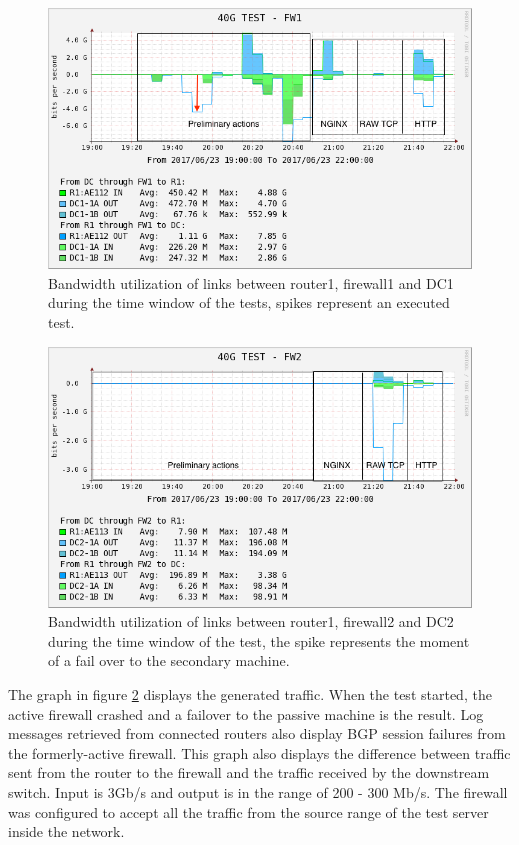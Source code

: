 \begin{figure}[H]
  \includegraphics[scale=0.5]{images/real-ae112.png}
  \caption{Bandwidth utilization of links between router1, firewall1 and DC1 during the time window of the tests, spikes represent an executed test.}
  \label{fig:testrealusageae112}
\end{figure}

\begin{figure}[H]
  \includegraphics[scale=0.5]{images/real-ae113.png}
  \caption{Bandwidth utilization of links between router1, firewall2 and DC2 during the time window of the test, the spike represents the moment of a fail over to the secondary machine.}
  \label{fig:testrealusageae113}
\end{figure}

The graph in figure \ref{fig:testrealusageae113} displays the generated traffic. When the test started, the active firewall crashed and a failover to the passive machine is the result. Log messages retrieved from connected routers also display BGP session failures from the formerly-active firewall. 
This graph also displays the difference between traffic sent from the router to the firewall and the traffic received by the downstream switch. 
Input is 3Gb/s and output is in the range of 200 - 300 Mb/s. The firewall was configured to accept all the traffic from the source range of the test server inside the network.

